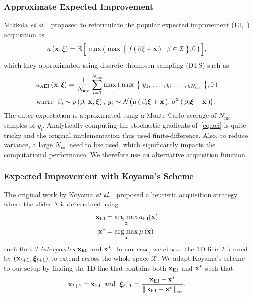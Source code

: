 \subsubsection{Approximate Expected Improvement}
Mikkola \textit{et al.}~\cite{10.1145/3072959.3073598} proposed to reformulate the popular expected improvement (EI,~\cite{jones_efficient_1998}) acquisition as
\begin{align}
  a\,(\mathbf{x}, \bm{\xi})
  = \mathbb{E}\,\Big[\, \max\big(\, \max\,\big\{\; f\,(\,\beta \xi + \mathbf{x}\,) \mid \beta \in \mathcal{I} \;\big\}, 0 \,\big)\,\Big],
\end{align}
which they approximated using discrete thompson sampling (DTS) such as
\begin{align}
  &a_{\mathrm{AEI}}\,(\mathbf{x}, \bm{\xi}) 
  = \frac{1}{N_{\mathrm{mc}}} \sum_{i=1}^{N_{\mathrm{mc}}} \max\,(\, \max\,\big\{\; y_1,\, \ldots \,, y_i \, \ldots \,, y_{N_\text{mc}} \;\big\}, 0 \,) \label{eq:aei} \\
  &\text{where} \;\;  \beta_i \sim p\left(\beta;\, \mathbf{x}, \bm{\xi}\right),\;
  y_i \sim \mathcal{N}\big( \mu\,(\,\beta_i \bm{\xi} + \mathbf{x} \,),\, \sigma^2\,(\, \beta_i \bm{\xi} + \mathbf{x} \,) \big).\nonumber
\end{align}
The outer expectation is approximated using a Monte Carlo average of \(N_{\text{mc}}\) samples of \(y_i\).
Analytically computing the stochastic gradients of~\cref{eq:aei} is quite tricky and the original implementation thus used finite-difference.
Also, to reduce variance, a large \(N_{\text{mc}}\) need to bse used, which significantly impacts the computational performance.
We therefore use an alternative acquisition function.

\subsubsection{Expected Improvement with Koyama's Scheme}
The original work by Koyama \textit{et al.}~\cite{koyama_sequential_2020} proposed a heuristic acquisition strategy where the slider \(\mathcal{I}\) is determined using
\begin{align}
  \mathbf{x}_{\mathrm{EI}}   &= \operatorname*{arg\,max}_{\mathbf{x}} a_{\mathrm{EI}}(\mathbf{x}) \label{eq:koyama_ei} \\
  \mathbf{x}^*   &= \operatorname*{arg\,max}_{\mathbf{x}} \mu\,(\mathbf{x}) \label{eq:koyama_opt}
\end{align}
such that \(\mathcal{I}\) \textit{interpolates} \(\mathbf{x}_{\mathrm{EI}}\) and \(\mathbf{x}^*\).
In our case, we choose the 1D line \(\mathcal{I}\) formed by \((\mathbf{x}_{t+1}, \bm{\xi}_{t+1})\) to extend across the whole space \(\mathcal{X}\).
We adapt Koyama's scheme to our setup by finding the 1D line that contains both \(\mathbf{x}_{\mathrm{EI}}\) and \(\mathbf{x}^*\) such that
\begin{align}
  \mathbf{x}_{t+1}   = \mathbf{x}_{\mathrm{EI}}\;\; \text{and} \;\;
  \bm{\xi}_{t+1} = \frac{\mathbf{x}_{\mathrm{EI}} - \mathbf{x}^*}{\left\lVert\,  \mathbf{x}_{\mathrm{EI}} - \mathbf{x}^*  \,\right\rVert_{\infty}}.\label{eq:xi_proj}
\end{align}

